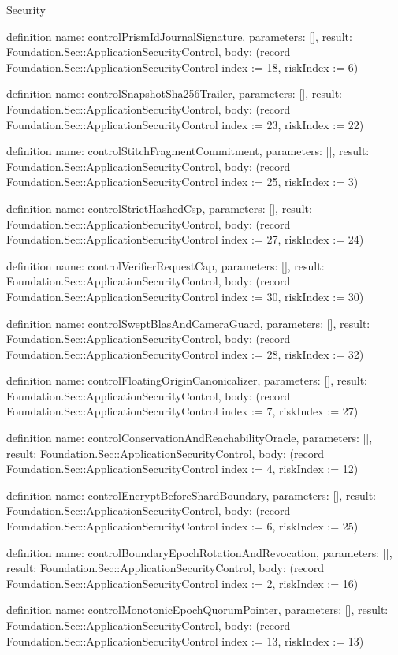 \begin{lexlean}{Security}
\begin{semanticmodule}
definition{
  name: controlPrismIdJournalSignature,
  parameters: [],
  result: Foundation.Sec::ApplicationSecurityControl,
  body: (record Foundation.Sec::ApplicationSecurityControl {index := 18, riskIndex := 6})
}

definition{
  name: controlSnapshotSha256Trailer,
  parameters: [],
  result: Foundation.Sec::ApplicationSecurityControl,
  body: (record Foundation.Sec::ApplicationSecurityControl {index := 23, riskIndex := 22})
}

definition{
  name: controlStitchFragmentCommitment,
  parameters: [],
  result: Foundation.Sec::ApplicationSecurityControl,
  body: (record Foundation.Sec::ApplicationSecurityControl {index := 25, riskIndex := 3})
}

definition{
  name: controlStrictHashedCsp,
  parameters: [],
  result: Foundation.Sec::ApplicationSecurityControl,
  body: (record Foundation.Sec::ApplicationSecurityControl {index := 27, riskIndex := 24})
}

definition{
  name: controlVerifierRequestCap,
  parameters: [],
  result: Foundation.Sec::ApplicationSecurityControl,
  body: (record Foundation.Sec::ApplicationSecurityControl {index := 30, riskIndex := 30})
}

definition{
  name: controlSweptBlasAndCameraGuard,
  parameters: [],
  result: Foundation.Sec::ApplicationSecurityControl,
  body: (record Foundation.Sec::ApplicationSecurityControl {index := 28, riskIndex := 32})
}

definition{
  name: controlFloatingOriginCanonicalizer,
  parameters: [],
  result: Foundation.Sec::ApplicationSecurityControl,
  body: (record Foundation.Sec::ApplicationSecurityControl {index := 7, riskIndex := 27})
}

definition{
  name: controlConservationAndReachabilityOracle,
  parameters: [],
  result: Foundation.Sec::ApplicationSecurityControl,
  body: (record Foundation.Sec::ApplicationSecurityControl {index := 4, riskIndex := 12})
}

definition{
  name: controlEncryptBeforeShardBoundary,
  parameters: [],
  result: Foundation.Sec::ApplicationSecurityControl,
  body: (record Foundation.Sec::ApplicationSecurityControl {index := 6, riskIndex := 25})
}

definition{
  name: controlBoundaryEpochRotationAndRevocation,
  parameters: [],
  result: Foundation.Sec::ApplicationSecurityControl,
  body: (record Foundation.Sec::ApplicationSecurityControl {index := 2, riskIndex := 16})
}

definition{
  name: controlMonotonicEpochQuorumPointer,
  parameters: [],
  result: Foundation.Sec::ApplicationSecurityControl,
  body: (record Foundation.Sec::ApplicationSecurityControl {index := 13, riskIndex := 13})
}


\end{semanticmodule}
\end{lexlean}

